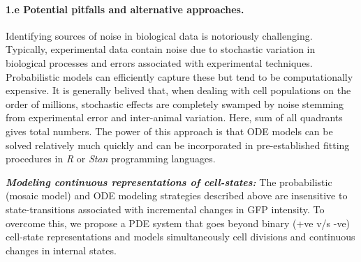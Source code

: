 \documentclass[11pt]{article}
\newcommand{\para}[1]{\vspace*{-4.5mm}\paragraph{#1}}
\newcommand{\red}[1]{{\color{red}{#1}}}
\begin{document}
\para{1.e Potential pitfalls and alternative approaches.}
Identifying sources of noise in biological data is notoriously challenging.
Typically, experimental data contain noise due to stochastic variation in biological processes and errors associated with experimental techniques.
Probabilistic models can efficiently capture these but tend to be computationally expensive.
It is generally belived that, when dealing with cell populations on the order of millions, stochastic effects are completely swamped by noise stemming from experimental error and inter-animal variation.
\red{In such regimes, when age-classes in the mosaic model contain over thousands of cells, we will %
define ODE systems to predict their mean behavior, following central limit theorem. 
Essentially, we will divide each module in the age-class in four quadrants based on GFP and Ki67 status (+ve or -ve). %
We will initialize the ODE systems with pre-defined number of age classes ($A_n$).
The ODE models will track movement of cells between the four quadrants and across the adjoining age-classes. %
We will also track fluxes among the modules.}
Here, sum of all quadrants gives total numbers. %
The power of this approach is that ODE models can be solved relatively much quickly and can be incorporated in pre-established fitting procedures in \textit{R} or \textit{Stan} programming languages.

\textbf{\textit{Modeling continuous representations of cell-states:}}
The probabilistic (mosaic model) and ODE modeling strategies described above %
are insensitive to state-transitions associated with incremental changes in GFP intensity. 
To overcome this, we propose a PDE system that goes beyond binary (+ve v/s -ve) cell-state representations and models simultaneously cell divisions and continuous changes in internal states.
\end{document}
